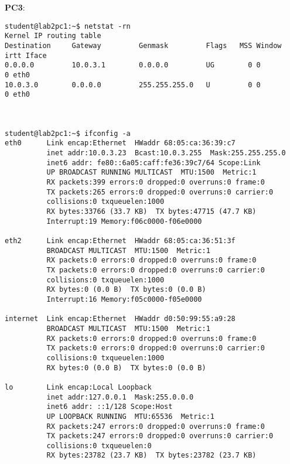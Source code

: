 \textbf{PC3}:
\begin{lstlisting}
student@lab2pc1:~$ netstat -rn
Kernel IP routing table
Destination     Gateway         Genmask         Flags   MSS Window  irtt Iface
0.0.0.0         10.0.3.1        0.0.0.0         UG        0 0          0 eth0
10.0.3.0        0.0.0.0         255.255.255.0   U         0 0          0 eth0



student@lab2pc1:~$ ifconfig -a
eth0      Link encap:Ethernet  HWaddr 68:05:ca:36:39:c7  
          inet addr:10.0.3.23  Bcast:10.0.3.255  Mask:255.255.255.0
          inet6 addr: fe80::6a05:caff:fe36:39c7/64 Scope:Link
          UP BROADCAST RUNNING MULTICAST  MTU:1500  Metric:1
          RX packets:399 errors:0 dropped:0 overruns:0 frame:0
          TX packets:265 errors:0 dropped:0 overruns:0 carrier:0
          collisions:0 txqueuelen:1000 
          RX bytes:33766 (33.7 KB)  TX bytes:47715 (47.7 KB)
          Interrupt:19 Memory:f06c0000-f06e0000 

eth2      Link encap:Ethernet  HWaddr 68:05:ca:36:51:3f  
          BROADCAST MULTICAST  MTU:1500  Metric:1
          RX packets:0 errors:0 dropped:0 overruns:0 frame:0
          TX packets:0 errors:0 dropped:0 overruns:0 carrier:0
          collisions:0 txqueuelen:1000 
          RX bytes:0 (0.0 B)  TX bytes:0 (0.0 B)
          Interrupt:16 Memory:f05c0000-f05e0000 

internet  Link encap:Ethernet  HWaddr d0:50:99:55:a9:28  
          BROADCAST MULTICAST  MTU:1500  Metric:1
          RX packets:0 errors:0 dropped:0 overruns:0 frame:0
          TX packets:0 errors:0 dropped:0 overruns:0 carrier:0
          collisions:0 txqueuelen:1000 
          RX bytes:0 (0.0 B)  TX bytes:0 (0.0 B)

lo        Link encap:Local Loopback  
          inet addr:127.0.0.1  Mask:255.0.0.0
          inet6 addr: ::1/128 Scope:Host
          UP LOOPBACK RUNNING  MTU:65536  Metric:1
          RX packets:247 errors:0 dropped:0 overruns:0 frame:0
          TX packets:247 errors:0 dropped:0 overruns:0 carrier:0
          collisions:0 txqueuelen:0 
          RX bytes:23782 (23.7 KB)  TX bytes:23782 (23.7 KB)
\end{lstlisting}

